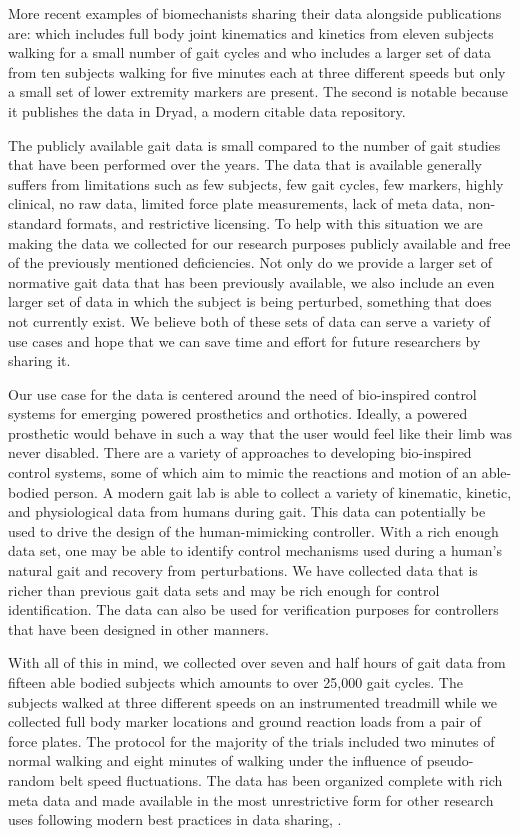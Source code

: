 \documentclass[fleqn,12pt]{wlpeerj}
\begin{document}
More recent examples of biomechanists sharing their data alongside publications
are: \cite{Bogert2013} which includes full body joint kinematics and kinetics
from eleven subjects walking for a small number of gait cycles and
\cite{Wang2014} who includes a larger set of data from ten subjects walking for
five minutes each at three different speeds but only a small set of lower
extremity markers are present. The second is notable because it publishes the
data in Dryad, a modern citable data repository.

The publicly available gait data is small compared to the number of gait
studies that have been performed over the years. The data that is available
generally suffers from limitations such as few subjects, few gait cycles, few
markers, highly clinical, no raw data, limited force plate measurements, lack
of meta data, non-standard formats, and restrictive licensing. To help with
this situation we are making the data we collected for our research purposes
publicly available and free of the previously mentioned deficiencies. Not only
do we provide a larger set of normative gait data that has been previously
available, we also include an even larger set of data in which the subject is
being perturbed, something that does not currently exist. We believe both of
these sets of data can serve a variety of use cases and hope that we can save
time and effort for future researchers by sharing it.

Our use case for the data is centered around the need of bio-inspired control
systems for emerging powered prosthetics and orthotics. Ideally, a powered
prosthetic would behave in such a way that the user would feel like their limb
was never disabled. There are a variety of approaches to developing
bio-inspired control systems, some of which aim to mimic the reactions and
motion of an able-bodied person. A modern gait lab is able to collect a variety
of kinematic, kinetic, and physiological data from humans during gait. This
data can potentially be used to drive the design of the human-mimicking
controller. With a rich enough data set, one may be able to identify control
mechanisms used during a human's natural gait and recovery from perturbations.
We have collected data that is richer than previous gait data sets and may be
rich enough for control identification. The data can also be used for
verification purposes for controllers that have been designed in other manners.

With all of this in mind, we collected over seven and half hours of gait data
from fifteen able bodied subjects which amounts to over 25,000 gait cycles. The
subjects walked at three different speeds on an instrumented treadmill while we
collected full body marker locations and ground reaction loads from a pair of
force plates. The protocol for the majority of the trials included two minutes
of normal walking and eight minutes of walking under the influence of
pseudo-random belt speed fluctuations. The data has been organized complete
with rich meta data and made available in the most unrestrictive form for other
research uses following modern best practices in data sharing, \cite{White2013}.
\end{document}
